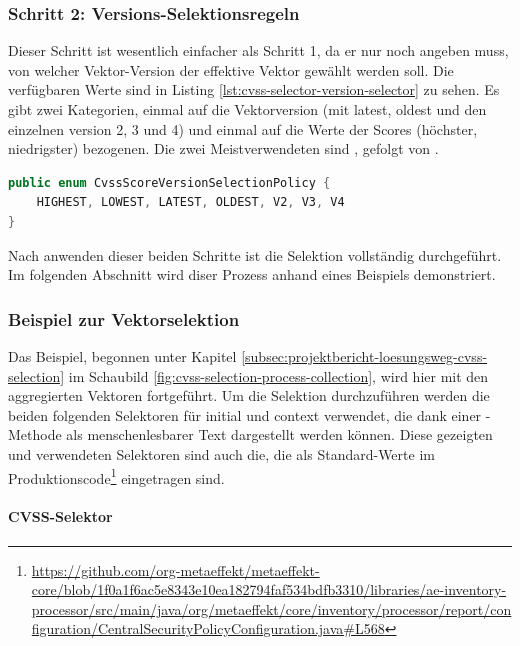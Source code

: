 \subsubsection{Schritt 2: Versions-Selektionsregeln} \label{subsubsec:projektbericht-loesungsweg-cvss-selection-rules-2}

Dieser Schritt ist wesentlich einfacher als Schritt 1, da er nur noch angeben muss, von welcher Vektor-Version der effektive Vektor gewählt werden soll.
Die verfügbaren Werte sind in Listing \ref{lst:cvss-selector-version-selector} zu sehen.
Es gibt zwei Kategorien, einmal auf die Vektorversion (mit latest, oldest und den einzelnen version 2, 3 und 4) und einmal auf die Werte der Scores (höchster, niedrigster) bezogenen.
Die zwei Meistverwendeten sind , gefolgt von .

\begin{lstlisting}[language=Java, label={lst:cvss-selector-version-selector}, caption={Gültige Werte für die Versions-Selektion}]
public enum CvssScoreVersionSelectionPolicy {
    HIGHEST, LOWEST, LATEST, OLDEST, V2, V3, V4
}
\end{lstlisting}

Nach anwenden dieser beiden Schritte ist die Selektion vollständig durchgeführt.
Im folgenden Abschnitt wird diser Prozess anhand eines Beispiels demonstriert.

\subsubsection{Beispiel zur Vektorselektion} \label{subsubsec:projektbericht-loesungsweg-cvss-selection-example}

Das Beispiel, begonnen unter Kapitel \ref{subsec:projektbericht-loesungsweg-cvss-selection} im Schaubild \ref{fig:cvss-selection-process-collection}, wird hier mit den aggregierten Vektoren fortgeführt.
Um die Selektion durchzuführen werden die beiden folgenden Selektoren für initial und context verwendet, die dank einer -Methode als menschenlesbarer Text dargestellt werden können.
Diese gezeigten und verwendeten Selektoren sind auch die, die als Standard-Werte im Produktionscode\footnote{\url{https://github.com/org-metaeffekt/metaeffekt-core/blob/1f0a1f6ac5e8343e10ea182794faf534bdfb3310/libraries/ae-inventory-processor/src/main/java/org/metaeffekt/core/inventory/processor/report/configuration/CentralSecurityPolicyConfiguration.java\#L568}} eingetragen sind.

\paragraph{CVSS-Selektor } \label{par:projektbericht-loesungsweg-cvss-selection-example-selector-initial}

